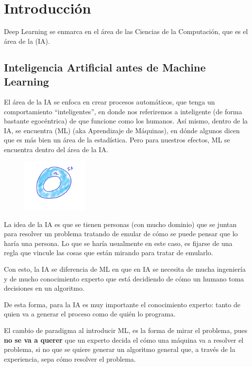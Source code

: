 \chapter{Introducción}

Deep Learning se enmarca en el área de las Ciencias de la Computación, que es el área de la  (IA).

\section{Inteligencia Artificial antes de Machine Learning}
El área de la IA se enfoca en crear procesos automáticos, que tenga un comportamiento ``inteligentes'', en donde nos referiremos a inteligente (de forma bastante egocéntrica) de que funcione como los humanos. Así mismo, dentro de la IA, se encuentra  (ML) (aka Aprendizaje de Máquinas), en dónde algunos dicen que es más bien un área de la estadística. Pero para nuestros efectos, ML se encuentra dentro del área de la IA.

\begin{figure}
  \begin{center}
    \includegraphics[width=0.3\textwidth]{img/img001.png}
  \end{center}
\end{figure}

La idea de la IA es que se tienen personas (con mucho dominio) que se juntan para resolver un problema tratando de emular de cómo se puede pensar que lo haría una persona. Lo que se haría usualmente en este caso, es fijarse de una regla que vincule las cosas que están mirando para tratar de emularlo. 

Con esto, la IA se diferencia de ML en que en IA se necesita de mucha ingeniería y de mucho conocimiento experto que está decidiendo de cómo un humano toma decisiones en un algoritmo.

De esta forma, para la IA es muy importante el conocimiento experto: tanto de quien va a generar el proceso como de quién lo programa. 

El cambio de paradigma al introducir ML, es la forma de mirar el problema, pues \textbf{no se va a querer} que un experto decida el cómo una máquina va a resolver el problema, si no que se quiere generar un algoritmo general que, a través de la experiencia, sepa cómo resolver el problema.

